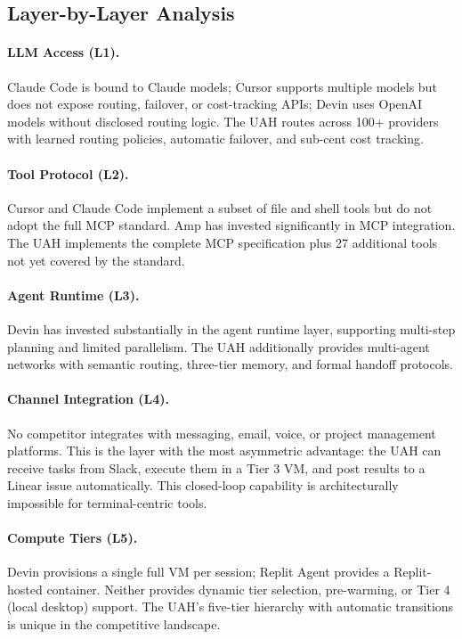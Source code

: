\documentclass[11pt]{article}
\begin{document}
\subsection{Layer-by-Layer Analysis}

\paragraph{LLM Access (L1).}
Claude Code is bound to Claude models; Cursor supports multiple models but
does not expose routing, failover, or cost-tracking APIs; Devin uses OpenAI
models without disclosed routing logic. The UAH routes across 100+ providers
with learned routing policies, automatic failover, and sub-cent cost tracking.

\paragraph{Tool Protocol (L2).}
Cursor and Claude Code implement a subset of file and shell tools but do not
adopt the full MCP standard. Amp has invested significantly in MCP integration.
The UAH implements the complete MCP specification plus 27 additional tools
not yet covered by the standard.

\paragraph{Agent Runtime (L3).}
Devin has invested substantially in the agent runtime layer, supporting
multi-step planning and limited parallelism. The UAH additionally provides
multi-agent networks with semantic routing, three-tier memory, and formal
handoff protocols.

\paragraph{Channel Integration (L4).}
No competitor integrates with messaging, email, voice, or project management
platforms. This is the layer with the most asymmetric advantage: the UAH can
receive tasks from Slack, execute them in a Tier 3 VM, and post results to a
Linear issue automatically. This closed-loop capability is architecturally
impossible for terminal-centric tools.

\paragraph{Compute Tiers (L5).}
Devin provisions a single full VM per session; Replit Agent provides a
Replit-hosted container. Neither provides dynamic tier selection, pre-warming,
or Tier 4 (local desktop) support. The UAH's five-tier hierarchy with
automatic transitions is unique in the competitive landscape.
\end{document}
